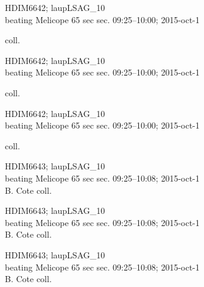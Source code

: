 \documentclass[2pt]{extarticle}
\begin{document}
\noindent
\parbox{0.16\textwidth}{\tiny \raggedright \rule[-0.3\baselineskip]{0pt}{10pt}HDIM6642; laupLSAG\_10\\ beating Melicope 65 sec sec. 09:25--10:00; 2015-oct-1\\ \rule{0ex}{0ex}\hspace{6em} coll.}
\parbox{0.16\textwidth}{\tiny \raggedright \rule[-0.3\baselineskip]{0pt}{10pt}HDIM6642; laupLSAG\_10\\ beating Melicope 65 sec sec. 09:25--10:00; 2015-oct-1\\ \rule{0ex}{0ex}\hspace{6em} coll.}
\parbox{0.16\textwidth}{\tiny \raggedright \rule[-0.3\baselineskip]{0pt}{10pt}HDIM6642; laupLSAG\_10\\ beating Melicope 65 sec sec. 09:25--10:00; 2015-oct-1\\ \rule{0ex}{0ex}\hspace{6em} coll.}
\parbox{0.16\textwidth}{\tiny \raggedright \rule[-0.3\baselineskip]{0pt}{10pt}HDIM6643; laupLSAG\_10\\ beating Melicope 65 sec sec. 09:25--10:08; 2015-oct-1\\ B. Cote coll.}
\parbox{0.16\textwidth}{\tiny \raggedright \rule[-0.3\baselineskip]{0pt}{10pt}HDIM6643; laupLSAG\_10\\ beating Melicope 65 sec sec. 09:25--10:08; 2015-oct-1\\ B. Cote coll.}
\parbox{0.16\textwidth}{\tiny \raggedright \rule[-0.3\baselineskip]{0pt}{10pt}HDIM6643; laupLSAG\_10\\ beating Melicope 65 sec sec. 09:25--10:08; 2015-oct-1\\ B. Cote coll.} \\ 
\vspace{0.001in} 
\end{document}
